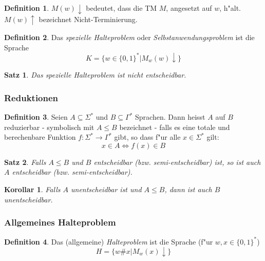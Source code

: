 \documentclass[german, 10pt, a4paper, twocolumn]{scrartcl}
\newtheorem{satz}{Satz}[section]
\newtheorem{korollar}{Korollar}[section]
\theoremstyle{definition}
\newtheorem*{definition}{Definition}
\theoremstyle{example}
\begin{document}
\begin{definition}
	$M(w)\downarrow$ bedeutet, dass die TM $M$, angesetzt auf $w$, h"alt. $M(w)\uparrow$ bezeichnet Nicht-Terminierung.
\end{definition}

\begin{definition}
	Das \textit{spezielle Halteproblem} oder \textit{Selbstanwendungsproblem} ist die Sprache
	\begin{displaymath}
		K = \{ w \in \{ 0,1\}^* | M_w(w)\downarrow \}
	\end{displaymath}
\end{definition}

\begin{satz}
	Das spezielle Halteproblem ist nicht entscheidbar.
\end{satz}

\subsubsection{Reduktionen}

\begin{definition}
	Seien $A \subseteq \Sigma^*$ und $B \subseteq \Gamma^*$ Sprachen. Dann heisst $A$ auf $B$ reduzierbar - symbolisch mit $A\leq B$ bezeichnet - falls es eine totale und berechenbare Funktion $f:\Sigma^* \to \Gamma^*$ gibt, so dass f"ur alle $x\in \Sigma^*$ gilt:
		\begin{displaymath}
			x \in A \Leftrightarrow f(x) \in B
		\end{displaymath}
\end{definition}

\begin{satz}
	Falls $A \leq B$ und $B$ entscheidbar (bzw. semi-entscheidbar) ist, so ist auch $A$ entscheidbar (bzw. semi-entscheidbar).
\end{satz}

\begin{korollar}
	Falls $A$ unentscheidbar ist und $A \leq B$, dann ist auch $B$ unentscheidbar.
\end{korollar}

\subsubsection{Allgemeines Halteproblem}

\begin{definition}
	Das (allgemeine) \textit{Halteproblem} ist die Sprache (f"ur $w,x \in \{ 0,1\}^*$)
	\begin{displaymath}
		H = \{ w \# x | M_w(x)\downarrow \}
	\end{displaymath}
\end{definition}
\end{document}
